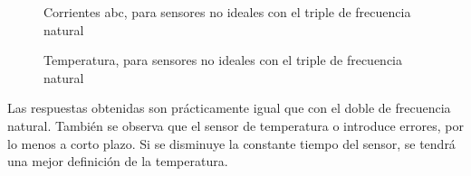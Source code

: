 \documentclass[a4paper, 10pt, onecolumn,journal]{ieeeconf}
\begin{document}
\begin{figure}[H]
	\centering
	\begin{adjustbox}{max width=\columnwidth}
	\end{adjustbox}
	\caption{Corrientes abc, para sensores no ideales con el triple de frecuencia natural}
	\label{Corrientes abc, para sensores no ideales con el triple de frecuencia natural}
\end{figure}

\begin{figure}[H]
	\centering
	\begin{adjustbox}{max width=\columnwidth}
	\end{adjustbox}
	\caption{Temperatura, para sensores no ideales con el triple de frecuencia natural}
	\label{Temperatura, para sensores no ideales con el triple de frecuencia natural}
\end{figure}
Las respuestas obtenidas son prácticamente igual que con el doble de frecuencia natural. También se observa que el sensor de temperatura o introduce errores, por lo menos a corto plazo. Si se disminuye la constante tiempo del sensor, se tendrá una mejor definición de la temperatura.
\end{document}
